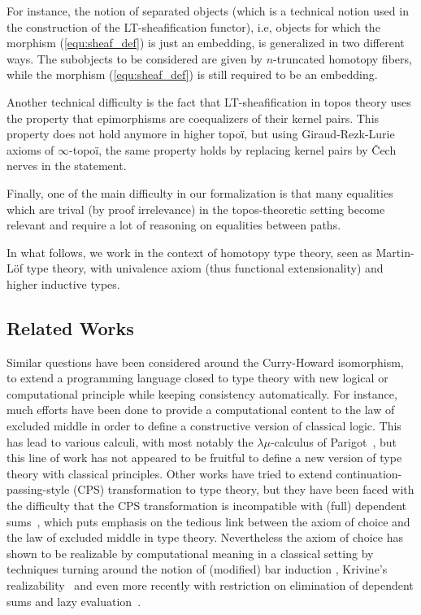 \documentclass[preprint,9pt,numbers]{sigplanconf}
\newcommand{\ie}{i.e,\xspace}
\begin{document}
For instance, the notion of separated objects (which is a technical
notion used in the construction of the LT-sheafification functor), \ie
objects for which the morphism
(\ref{equ:sheaf_def}) is just an embedding, is generalized in two
different ways.  
%
The subobjects to be considered are given by $n$-truncated homotopy fibers,
while the morphism (\ref{equ:sheaf_def}) is still required to be an
embedding.

Another technical difficulty is the fact that LT-sheafification in topos
theory uses the property that epimorphisms are coequalizers of their
kernel pairs. This property does not hold anymore in higher topoï, but
using Giraud-Rezk-Lurie axioms of $\infty$-topoï, the same property
holds by replacing kernel pairs by \v{C}ech nerves in the statement.

Finally, one of the main difficulty in our formalization is that many
equalities which are trival (by proof irrelevance) in the topos-theoretic
setting become relevant and require a lot of reasoning on equalities
between paths.

In what follows, we work in the context of homotopy type theory, seen
as Martin-Löf type theory, with univalence axiom (thus functional
extensionality) and higher inductive types.

\subsection{Related Works}
\label{sec:related-works}

Similar questions have been considered around the Curry-Howard
isomorphism, to extend a programming language closed to type theory
with new logical or computational principle while keeping consistency
automatically.
%
For instance, much efforts have been done to provide a computational
content to the law of excluded middle in order to define a
constructive version of classical logic. This has lead to various
calculi, with most notably the $\lambda \mu$-calculus of
Parigot~\cite{parigot1993classical}, but this line of work has not
appeared to be fruitful to define a new version of type theory with
classical principles.
%
Other works have tried to extend continuation-passing-style (CPS)
transformation to type theory, but they have been faced with the
difficulty that the CPS transformation is incompatible with (full) dependent
sums~\cite{barthe2002cps}, which puts emphasis on the tedious link
between the axiom of choice and the law of excluded middle in type theory.
%
Nevertheless the axiom of choice has shown to be realizable by
computational meaning in a classical setting by techniques turning
around the notion of (modified) bar induction
\cite{berardi1998computational}, Krivine's
realizability~\cite{krivine2003dependent} and even more recently with
restriction on elimination of dependent sums and lazy
evaluation~\cite{herbelin2012constructive}.
\end{document}
